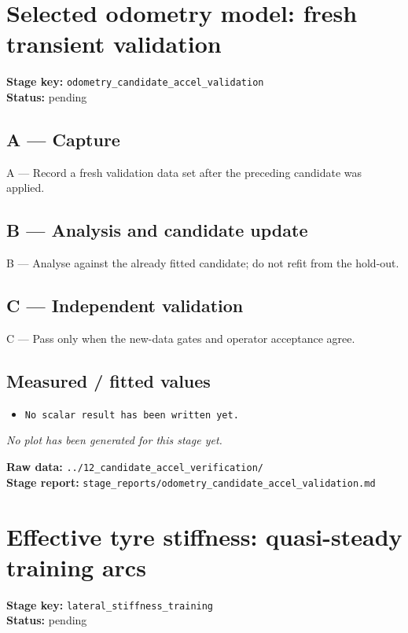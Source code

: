\documentclass[11pt,a4paper]{article}
\begin{document}
\section*{Selected odometry model: fresh transient validation}
\textbf{Stage key:} \texttt{odometry\_candidate\_accel\_validation}\\
\textbf{Status:} pending\\

\subsection*{A --- Capture}
A — Record a fresh validation data set after the preceding candidate was applied.

\subsection*{B --- Analysis and candidate update}
B — Analyse against the already fitted candidate; do not refit from the hold-out.

\subsection*{C --- Independent validation}
C — Pass only when the new-data gates and operator acceptance agree.

\subsection*{Measured / fitted values}
\begin{itemize}\setlength\itemsep{0pt}
\item \texttt{No scalar result has been written yet.}
\end{itemize}

\textit{No plot has been generated for this stage yet.}

\vfill
\textbf{Raw data:} \texttt{../12\_candidate\_accel\_verification/}\\
\textbf{Stage report:} \texttt{stage\_reports/odometry\_candidate\_accel\_validation.md}
\clearpage
\small
\section*{Effective tyre stiffness: quasi-steady training arcs}
\textbf{Stage key:} \texttt{lateral\_stiffness\_training}\\
\textbf{Status:} pending\\
\end{document}
